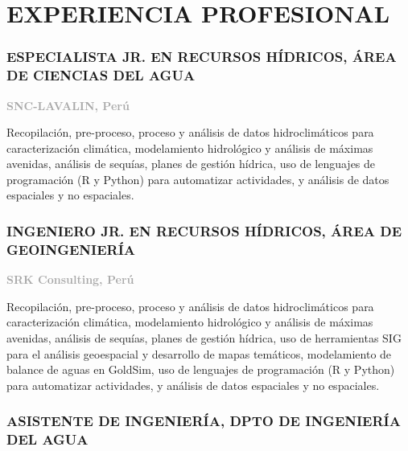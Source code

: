 \documentclass[
  10,
]{article}
\begin{document}
\newpage
\justify

\hypertarget{experiencia-profesional}{%
\section{EXPERIENCIA PROFESIONAL}\label{experiencia-profesional}}

\hypertarget{especialista-jr.-en-recursos-huxeddricos-uxe1rea-de-ciencias-del-agua}{%
\subsubsection{ESPECIALISTA JR. EN RECURSOS HÍDRICOS, ÁREA DE CIENCIAS
DEL
AGUA}\label{especialista-jr.-en-recursos-huxeddricos-uxe1rea-de-ciencias-del-agua}}

\textcolor{darkgray}{\textbf{SNC-LAVALIN, Perú}}

Recopilación, pre-proceso, proceso y análisis de datos hidroclimáticos
para caracterización climática, modelamiento hidrológico y análisis de
máximas avenidas, análisis de sequías, planes de gestión hídrica, uso de
lenguajes de programación (R y Python) para automatizar actividades, y
análisis de datos espaciales y no espaciales.

\hypertarget{ingeniero-jr.-en-recursos-huxeddricos-uxe1rea-de-geoingenieruxeda}{%
\subsubsection{INGENIERO JR. EN RECURSOS HÍDRICOS, ÁREA DE
GEOINGENIERÍA}\label{ingeniero-jr.-en-recursos-huxeddricos-uxe1rea-de-geoingenieruxeda}}

\textcolor{darkgray}{\textbf{SRK Consulting, Perú}}

Recopilación, pre-proceso, proceso y análisis de datos hidroclimáticos
para caracterización climática, modelamiento hidrológico y análisis de
máximas avenidas, análisis de sequías, planes de gestión hídrica, uso de
herramientas SIG para el análisis geoespacial y desarrollo de mapas
temáticos, modelamiento de balance de aguas en GoldSim, uso de lenguajes
de programación (R y Python) para automatizar actividades, y análisis de
datos espaciales y no espaciales.

\hypertarget{asistente-de-ingenieruxeda-dpto-de-ingenieruxeda-del-agua}{%
\subsubsection{ASISTENTE DE INGENIERÍA, DPTO DE INGENIERÍA DEL
AGUA}\label{asistente-de-ingenieruxeda-dpto-de-ingenieruxeda-del-agua}}
\end{document}

